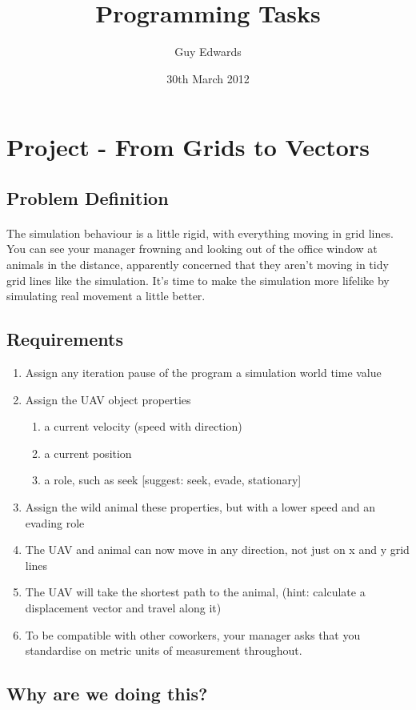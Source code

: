 \documentclass[11pt]{book}
\title{\textbf{Programming Tasks}}
\author{Guy Edwards}
\date{30th March 2012}
\begin{document}
\section{Project - From Grids to Vectors}

\subsection{Problem Definition}

\paragraph{}  The simulation behaviour is a little rigid, with everything moving in grid lines. You can see your manager frowning and looking out of the office window at animals in the distance, apparently concerned that they aren't moving in tidy grid lines like the simulation. It's time to make the simulation more lifelike by simulating real movement a little better.

\subsection{Requirements}
\begin{enumerate}
\item Assign any iteration pause of the program a simulation world time value
\item Assign the UAV object properties
    \begin{enumerate}
    \item a current velocity (speed with direction)
    \item a current position
    \item a role, such as seek [suggest: seek, evade, stationary]
    \end{enumerate}
\item Assign the wild animal these properties, but with a lower speed and an evading role
\item The UAV and animal can now move in any direction, not just on x and y grid lines
\item The UAV will take the shortest path to the animal, (hint: calculate a displacement vector and travel along it)
\item To be compatible with other coworkers, your manager asks that you standardise on metric units of measurement throughout.
\end{enumerate}

\subsection{Why are we doing this?}
\end{document}
